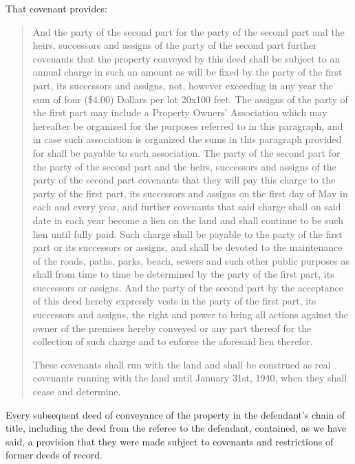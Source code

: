 That covenant provides:
\begin{quotation}
And the party of the second part for the party of the second part and the
heirs, successors and assigns of the party of the second part further covenants
that the property conveyed by this deed shall be subject to an annual charge in
such an amount as will be fixed by the party of the first part, its successors
and assigns, not, however exceeding in any year the sum of four (\$4.00) Dollars
per lot 20x100 feet. The assigns of the party of the first part may include a
Property Owners' Association which may hereafter be organized for the purposes
referred to in this paragraph, and in case such association is organized the
sums in this paragraph provided for shall be payable to such association. The
party of the second part for the party of the second part and the heirs,
successors and assigns of the party of the second part covenants that they will
pay this charge to the party of the first part, its successors and assigns on
the first day of May in each and every year, and further covenants that said
charge shall on said date in each year become a lien on the land and shall
continue to be such lien until fully paid. Such charge shall be payable to the
party of the first part or its successors or assigns, and shall be devoted to
the maintenance of the roads, paths, parks, beach, sewers and such other public
purposes as shall from time to time be determined by the party of the first
part, its successors or assigns. And the party of the second part by the
acceptance of this deed hereby expressly vests in the party of the first part,
its successors and assigns, the right and power to bring all actions against the
owner of the premises hereby conveyed or any part thereof for the collection of
such charge and to enforce the aforesaid lien therefor.

These covenants shall run with the land and shall be construed as real
covenants running with the land until January 31st, 1940, when they shall cease
and determine.
\end{quotation}

Every subsequent deed of conveyance of the property in the defendant's chain of
title, including the deed from the referee to the defendant, contained, as we
have said, a provision that they were made subject to covenants and restrictions
of former deeds of record.

